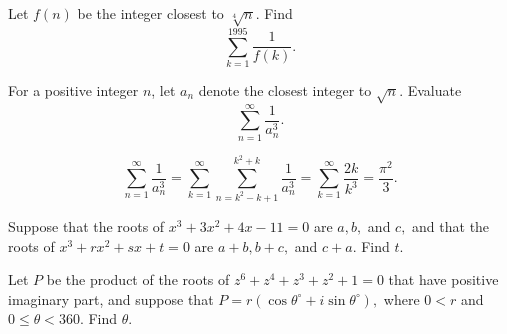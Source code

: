 \documentclass[11pt]{article}
\theoremstyle{definition}
\begin{document}
\begin{question}[name={1995 AIME, \href{https://artofproblemsolving.com/community/c4p394531}{Problem 13}}]
	Let $f(n)$ be the integer closest to $\sqrt[4]{n}.$ Find $$\sum_{k=1}^{1995}\frac 1{f(k)}.$$
\end{question}


%	












\begin{question}[name={1994 Turkey, Second Round, \href{https://artofproblemsolving.com/community/c4p638049}{Problem 1}}]
	For a positive integer $n$, let $a_{n}$ denote the closest integer to $\sqrt{n}$. Evaluate\[\sum_{n=1}^\infty{\frac{1}{a_{n}^{3}}}.\]
\end{question}


\begin{solution}[name={Solution by Rust and Deedlit}]
	$$\sum_{n=1}^\infty{\frac{1}{a_{n}^{3}}}=\sum_{k=1}^{\infty }\sum_{n=k^{2}-k+1}^{k^{2}+k}\frac{1}{a_{n}^{3}}=\sum_{k=1}^{\infty}\frac{2k}{k^{3}}=\frac{\pi^{2}}{3}.$$	
\end{solution}













\begin{question}[name={1996 AIME, \href{https://artofproblemsolving.com/community/c4p394233}{Problem 5}}]
	Suppose that the roots of $x^3+3x^2+4x-11=0$ are $a, b,$ and $c,$ and that the roots of $x^3+rx^2+sx+t=0$ are $a+b, b+c,$ and $c+a.$ Find $t.$	
	
\end{question}


%	












\begin{question}[name={1996 AIME, \href{https://artofproblemsolving.com/community/c4p394249}{Problem 11}}]
	Let $P$ be the product of the roots of $z^6+z^4+z^3+z^2+1=0$ that have positive imaginary part, and suppose that $P=r(\cos \theta^\circ+i\sin \theta^\circ),$ where $0<r$ and $0\le \theta <360.$ Find $\theta.$	
\end{question}
\end{document}
